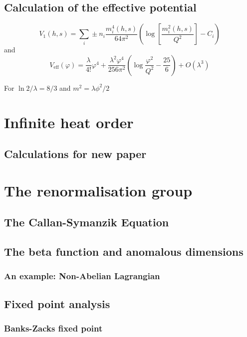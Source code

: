 \subsection{Calculation of the effective potential}
\begin{equation}
    V_1(h, s) = \sum_i \pm n_i \frac{m_i^4(h, s)}{64\pi^2} \left( \log \left[ \frac{m_i^2(h, s)}{Q^2} \right] - C_i \right)
\end{equation}
and 
\begin{equation}
    V_{\text{eff}}(\varphi) = \frac{\lambda}{4!}\varphi^4 + \frac{\lambda^2 \varphi^4}{256\pi^2} \left( \log \frac{\varphi^2}{Q^2} - \frac{25}{6} \right) + O(\lambda^3)
\end{equation}

For $\ln 2/\lambda =8/3$ and $m^2=\lambda\phi^2/2$

\section{Infinite heat order}
\subsection{Calculations for new paper}

\section{The renormalisation group}



\subsection{The Callan-Symanzik Equation}

\subsection{The beta function and anomalous dimensions}

\subsubsection{An example: Non-Abelian Lagrangian}

\subsection{Fixed point analysis}

\subsubsection{Banks-Zacks fixed point}

